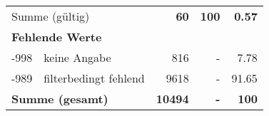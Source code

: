 \begin{longtable}{lXrrr}
     \midrule
     \multicolumn{2}{l}{Summe (gültig)} &
       \textbf{\num{60}} &
     \textbf{\num{100}} &
       \textbf{\num[round-mode=places,round-precision=2]{0.57}} \\
     \multicolumn{5}{l}{\textbf{Fehlende Werte}}\\
       -998 &
       keine Angabe &
         \num{816} &
        - &
         \num[round-mode=places,round-precision=2]{7.78} \\
       -989 &
       filterbedingt fehlend &
         \num{9618} &
        - &
         \num[round-mode=places,round-precision=2]{91.65} \\
     \midrule
     \multicolumn{2}{l}{\textbf{Summe (gesamt)}} &
          \textbf{\num{10494}} &
        \textbf{-} &
        \textbf{\num{100}} \\
     \bottomrule
     \end{longtable}
     
